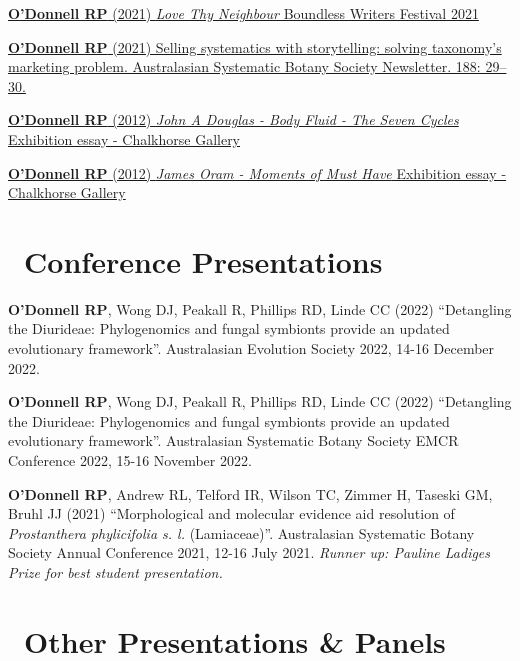 \documentclass[10,a4paper,]{awesome-cv}
\begin{document}
\href{https://www.sciencewritenow.com/essays-craft-memoir/love-thy-neighbour}{\textbf{O'Donnell
RP} (2021) \emph{Love Thy Neighbour} Boundless Writers Festival 2021}

\href{https://www.asbs.org.au/newsletter/pdf/21-sep-188.pdf}{\textbf{O'Donnell
RP} (2021) Selling systematics with storytelling: solving taxonomy's
marketing problem. Australasian Systematic Botany Society Newsletter.
188: 29--30.}

\href{https://rpodonnell.github.io/cv/JAD_BODY_FLUIDfinal.pdf}{\textbf{O'Donnell
RP} (2012) \emph{John A Douglas - Body Fluid - The Seven Cycles}
Exhibition essay - Chalkhorse Gallery}

\href{https://rpodonnell.github.io/cv/JamesOramMomentsofmusthave_RS.pdf}{\textbf{O'Donnell
RP} (2012) \emph{James Oram - Moments of Must Have} Exhibition essay -
Chalkhorse Gallery}

\hypertarget{conference-presentations}{%
\section{\texorpdfstring{\acvHeaderIconSep~Conference
Presentations}{~Conference Presentations}}\label{conference-presentations}}

\textbf{O'Donnell RP}, Wong DJ, Peakall R, Phillips RD, Linde CC (2022)
``Detangling the Diurideae: Phylogenomics and fungal symbionts provide
an updated evolutionary framework''. Australasian Evolution Society
2022, 14-16 December 2022.

\textbf{O'Donnell RP}, Wong DJ, Peakall R, Phillips RD, Linde CC (2022)
``Detangling the Diurideae: Phylogenomics and fungal symbionts provide
an updated evolutionary framework''. Australasian Systematic Botany
Society EMCR Conference 2022, 15-16 November 2022.

\textbf{O'Donnell RP}, Andrew RL, Telford IR, Wilson TC, Zimmer H,
Taseski GM, Bruhl JJ (2021) ``Morphological and molecular evidence aid
resolution of \emph{Prostanthera phylicifolia s. l.} (Lamiaceae)''.
Australasian Systematic Botany Society Annual Conference 2021, 12-16
July 2021. \emph{Runner up: Pauline Ladiges Prize for best student
presentation.}

\hypertarget{other-presentations-panels}{%
\section{\texorpdfstring{\acvHeaderIconSep~Other
Presentations \&
Panels}{~Other Presentations \& Panels}}\label{other-presentations-panels}}
\end{document}
